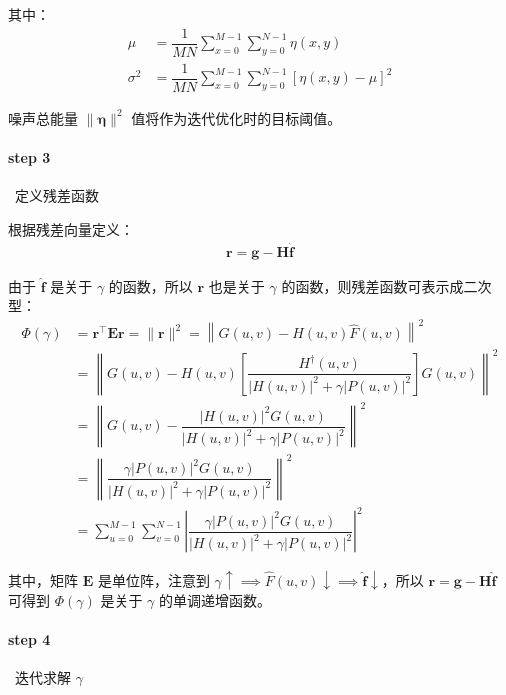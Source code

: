 \documentclass{article}
\begin{document}
其中：
\begin{align*}
    \mu&=\dfrac{1}{MN}\sum_{x=0}^{M-1}\sum_{y=0}^{N-1}\eta(x,y)
    \\
    \sigma^2&=\dfrac{1}{MN}\sum_{x=0}^{M-1}\sum_{y=0}^{N-1}\left[\eta(x,y)-\mu\right]^2
\end{align*}

噪声总能量 $\lVert\bm{\eta}\rVert^2$ 值将作为迭代优化时的目标阈值。

\paragraph*{step 3}~{定义残差函数}

根据残差向量定义：
\begin{align*}
    \bm{r}=\bm{g}-\bm{H}\widehat{\bm{f}}
\end{align*}

由于 $\widehat{\bm{f}}$ 是关于 $\gamma$ 的函数，所以 $\bm{r}$ 也是关于 $\gamma$ 的函数，则残差函数可表示成二次型：
\begin{align*}
    \varPhi(\gamma)&=\bm{r}^{\top}\bm{E}\bm{r}=\lVert\bm{r}\rVert^2=\left\lVert G(u,v)-H(u,v)\widehat{F}(u,v)\right\rVert^2
    \\
    &=\left\lVert G(u,v)-H(u,v)\left[\dfrac{\displaystyle H^{\bm{\dagger}}(u,v)}{\displaystyle\left|H(u,v)\right|^2+\gamma\left|P(u,v)\right|^2}\right]G(u,v)\right\rVert^2
    \\
    &=\left\lVert G(u,v)-\dfrac{\displaystyle \left|H(u,v)\right|^2G(u,v)}{\displaystyle\left|H(u,v)\right|^2+\gamma\left|P(u,v)\right|^2} \right\rVert^2
    \\
    &=\left\lVert \dfrac{\displaystyle \gamma\left|P(u,v)\right|^2G(u,v)}{\displaystyle\left|H(u,v)\right|^2+\gamma\left|P(u,v)\right|^2} \right\rVert^2
    \\
    &=\sum_{u=0}^{M-1}\sum_{v=0}^{N-1}\left| \dfrac{\displaystyle \gamma\left|P(u,v)\right|^2G(u,v)}{\displaystyle\left|H(u,v)\right|^2+\gamma\left|P(u,v)\right|^2} \right|^2
\end{align*}

其中，矩阵 $\bm{E}$ 是单位阵，注意到 $\gamma\uparrow\implies\widehat{F}(u,v)\downarrow\implies\widehat{\bm{f}}\downarrow$，所以 $\bm{r}=\bm{g}-\bm{H}\widehat{\bm{f}}$ 可得到 $\varPhi(\gamma)$ 是关于 $\gamma$ 的单调递增函数。

\paragraph*{step 4}~{迭代求解 $\gamma$}
\end{document}

